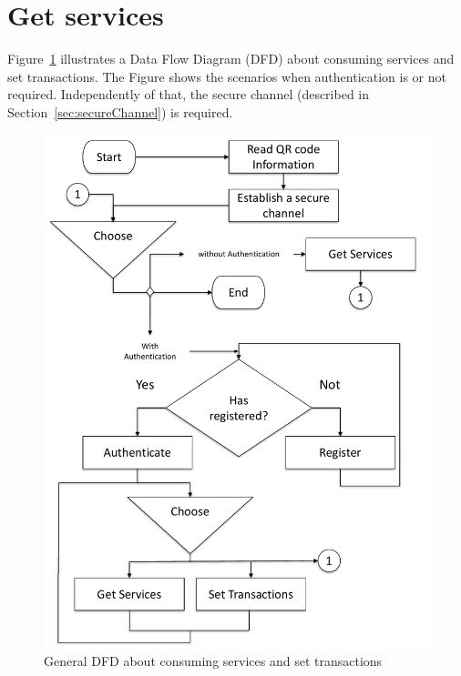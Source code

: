 \section{Get services}
\label{sec:getServices}
Figure~\ref{fig:dfdForAuthServices} illustrates a Data Flow Diagram (DFD) about consuming  
services and set transactions. The Figure shows the scenarios when authentication is or 
not required. Independently of that, the secure channel (described in Section~\ref{sec:secureChannel}) 
is required.

\begin{figure}[bt]
  \centering
    \includegraphics[scale=0.4]{images/dfd.pdf}
        \caption{General DFD about consuming services and set transactions}
    \label{fig:dfdForAuthServices}
\end{figure}


